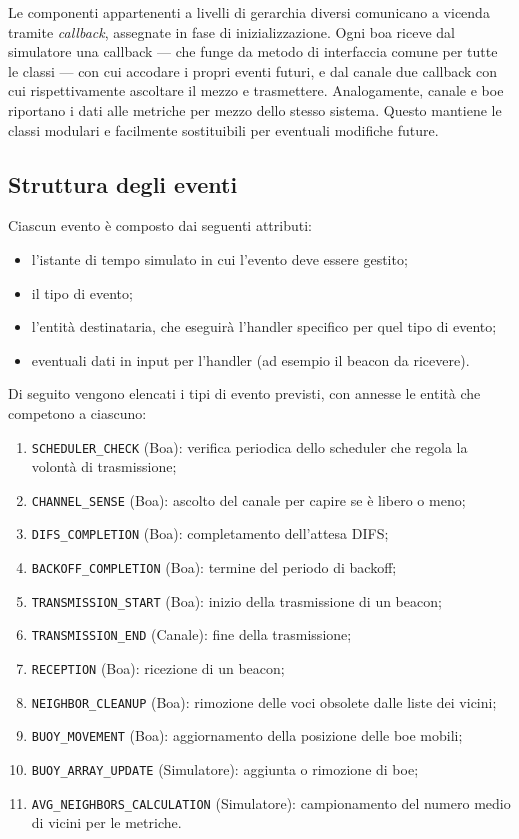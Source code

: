 Le componenti appartenenti a livelli di gerarchia diversi comunicano a vicenda tramite \emph{callback}, assegnate in
fase di inizializzazione. Ogni boa riceve dal simulatore una callback --- che funge da metodo di interfaccia comune per tutte le classi --- con cui accodare i
propri eventi futuri, e dal canale due callback con cui rispettivamente ascoltare il
mezzo e trasmettere. Analogamente, canale e boe riportano i dati alle metriche per mezzo dello stesso sistema.
Questo mantiene le classi modulari e facilmente sostituibili per eventuali modifiche future.

\subsection{Struttura degli eventi}
\label{sec:event}
Ciascun evento \`e composto dai seguenti attributi:
\begin{itemize}[leftmargin=1.4em, nosep]
    \item l'istante di tempo simulato in cui l'evento deve essere gestito;
    \item il tipo di evento;
    \item l'entit\`a destinataria, che eseguir\`a l'handler specifico per quel tipo di evento;
    \item eventuali dati in input per l'handler (ad esempio il beacon da ricevere).
\end{itemize}
Di seguito vengono elencati i tipi di evento previsti, con annesse le entit\`a
che competono a ciascuno:
\begin{enumerate}[leftmargin=1.6em,nosep]
  \item \texttt{SCHEDULER\_CHECK} (Boa): verifica periodica dello scheduler che regola la volont\`a di trasmissione;
  \item \texttt{CHANNEL\_SENSE} (Boa): ascolto del canale per capire se \`e libero o meno;
  \item \texttt{DIFS\_COMPLETION} (Boa): completamento dell'attesa DIFS;
  \item \texttt{BACKOFF\_COMPLETION} (Boa): termine del periodo di backoff;
  \item \texttt{TRANSMISSION\_START} (Boa): inizio della trasmissione di un beacon;
  \item \texttt{TRANSMISSION\_END} (Canale): fine della trasmissione;
  \item \texttt{RECEPTION} (Boa): ricezione di un beacon;
  \item \texttt{NEIGHBOR\_CLEANUP} (Boa): rimozione delle voci obsolete dalle liste dei vicini;
  \item \texttt{BUOY\_MOVEMENT} (Boa): aggiornamento della posizione delle boe mobili;
  \item \texttt{BUOY\_ARRAY\_UPDATE} (Simulatore): aggiunta o rimozione di boe;
  \item \texttt{AVG\_NEIGHBORS\_CALCULATION} (Simulatore): campionamento del numero medio di vicini per le metriche.
\end{enumerate}

